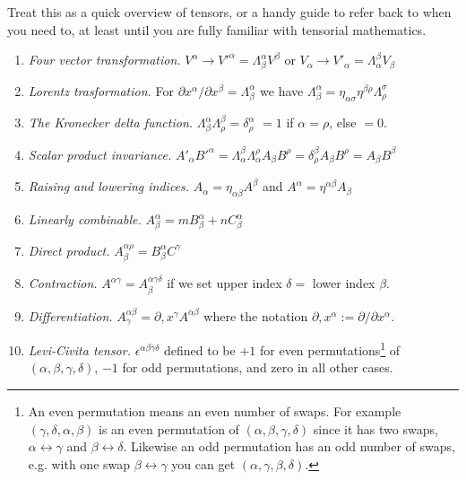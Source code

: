 \documentclass{tufte-handout}
\begin{document}
Treat this as a quick overview of tensors, or a handy guide to refer back to when you need to, at least until you are fully familiar with tensorial mathematics.

\begin{enumerate}
	\item \textit{Four vector transformation.} $V^\alpha \rightarrow V'^\alpha = \Lambda^\alpha_\beta V^\beta$ or $V_\alpha \rightarrow V'_\alpha = \Lambda_\alpha^\beta V_\beta$ \vspace*{-1ex}
	\item \textit{Lorentz trasformation.} For $\partial x^\alpha / \partial x^\beta = \Lambda^\alpha_\beta $ we have $\Lambda^\alpha_\beta = \eta_{\alpha\sigma}\eta^{\beta\rho}\Lambda^\sigma_\rho$ \vspace*{-1ex}
	\item \textit{The Kronecker delta function.} $\Lambda^\alpha_\beta \Lambda^\beta_\rho = \delta^\alpha_\rho$ $= 1$ if $\alpha = \rho$, else $= 0$. \vspace*{-1ex}
	\item \textit{Scalar product invariance.} $A'_\alpha B'^\alpha = \Lambda^\beta_\alpha \Lambda^\rho_\alpha A_\beta B^\rho = \delta^\beta_\rho A_\beta B^\rho = A_\beta B^\beta$ \vspace*{-1ex}
	\item \textit{Raising and lowering indices.} $A_\alpha = \eta_{\alpha\beta}A^\beta$ and $A^\alpha = \eta^{\alpha\beta}A_\beta$ \vspace*{-1ex}
	\item \textit{Linearly combinable.} $A^\alpha_\beta = m B^\alpha_\beta + n C^\alpha_\beta$ \vspace*{-1ex}
	\item \textit{Direct product.} $A^{\alpha\rho}_\beta = B^\alpha_\beta C^\gamma$ \vspace*{-1ex}
	\item \textit{Contraction.} $A^{\alpha\gamma} = A^{\alpha\gamma\delta}_\beta$ if we set upper index $\delta =$ lower index $\beta$. \vspace*{-1ex}
	\item \textit{Differentiation.} $A^{\alpha\beta}_\gamma = \partial , x^\gamma A^{\alpha\beta}$ where the notation $\partial , x^\alpha := \partial/\partial x^\alpha$.
	\item \textit{Levi-Civita tensor.} $\epsilon^{\alpha\beta\gamma\delta}$ defined to be $+1$ for even permutations\footnote{An even permutation means an even number of swaps. For example $(\gamma, \delta, \alpha, \beta)$ is an even permutation of $(\alpha, \beta, \gamma, \delta)$ since it has two swaps, $\alpha \leftrightarrow \gamma$ and $\beta \leftrightarrow \delta$. Likewise an odd permutation has an odd number of swaps, e.g. with one swap $\beta \leftrightarrow \gamma$ you can get $(\alpha, \gamma, \beta, \delta)$.} of $(\alpha, \beta, \gamma, \delta)$, $-1$ for odd permutations, and zero in all other cases.
\end{enumerate}
\end{document}
